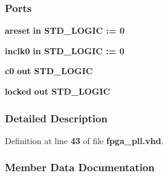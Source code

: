 \subsubsection*{Ports}
 \begin{DoxyCompactItemize}
\item 
{\bf areset}  {\bfseries {\bfseries \textcolor{keywordflow}{in}\textcolor{vhdlchar}{ }}} {\bfseries \textcolor{comment}{S\+T\+D\+\_\+\+L\+O\+G\+IC}\textcolor{vhdlchar}{ }\textcolor{vhdlchar}{ }\textcolor{vhdlchar}{\+:}\textcolor{vhdlchar}{=}\textcolor{vhdlchar}{ }\textcolor{vhdlchar}{ }\textcolor{vhdlchar}{\textquotesingle{}}\textcolor{vhdlchar}{ } \textcolor{vhdldigit}{0} \textcolor{vhdlchar}{ }\textcolor{vhdlchar}{\textquotesingle{}}\textcolor{vhdlchar}{ }} 
\item 
{\bf inclk0}  {\bfseries {\bfseries \textcolor{keywordflow}{in}\textcolor{vhdlchar}{ }}} {\bfseries \textcolor{comment}{S\+T\+D\+\_\+\+L\+O\+G\+IC}\textcolor{vhdlchar}{ }\textcolor{vhdlchar}{ }\textcolor{vhdlchar}{\+:}\textcolor{vhdlchar}{=}\textcolor{vhdlchar}{ }\textcolor{vhdlchar}{ }\textcolor{vhdlchar}{\textquotesingle{}}\textcolor{vhdlchar}{ } \textcolor{vhdldigit}{0} \textcolor{vhdlchar}{ }\textcolor{vhdlchar}{\textquotesingle{}}\textcolor{vhdlchar}{ }} 
\item 
{\bf c0}  {\bfseries {\bfseries \textcolor{keywordflow}{out}\textcolor{vhdlchar}{ }}} {\bfseries \textcolor{comment}{S\+T\+D\+\_\+\+L\+O\+G\+IC}\textcolor{vhdlchar}{ }} 
\item 
{\bf locked}  {\bfseries {\bfseries \textcolor{keywordflow}{out}\textcolor{vhdlchar}{ }}} {\bfseries \textcolor{comment}{S\+T\+D\+\_\+\+L\+O\+G\+IC}\textcolor{vhdlchar}{ }} 
\end{DoxyCompactItemize}


\subsubsection{Detailed Description}


Definition at line {\bf 43} of file {\bf fpga\+\_\+pll.\+vhd}.



\subsubsection{Member Data Documentation}
\paragraph[{ all }]{\hspace{0.3cm}{\ttfamily [Package]}}\label{classfpga__pll_a470a86ce8776f637b0483eabf2d92ad2}


